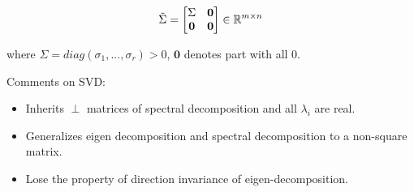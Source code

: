 $$\tilde{\Sigma} = 
\left[
\begin{matrix}
\Sigma & \textbf{0}\\
\textbf{0}&\textbf{0}
\end{matrix}
\right]\in \mathbb{R}^{m\times n}
$$

where $\Sigma = diag(\sigma_1,...,\sigma_r)> 0$, $\textbf{0}$ denotes part with all 0. 

\vspace{0.3cm}

Comments on SVD: 
\begin{itemize}
	\item Inherits $\perp$ matrices of spectral decomposition and all $\lambda_i$ are real.
	\item Generalizes eigen decomposition and spectral decomposition to a non-square matrix.
	\item Lose the property of direction invariance of eigen-decomposition.
\end{itemize}


